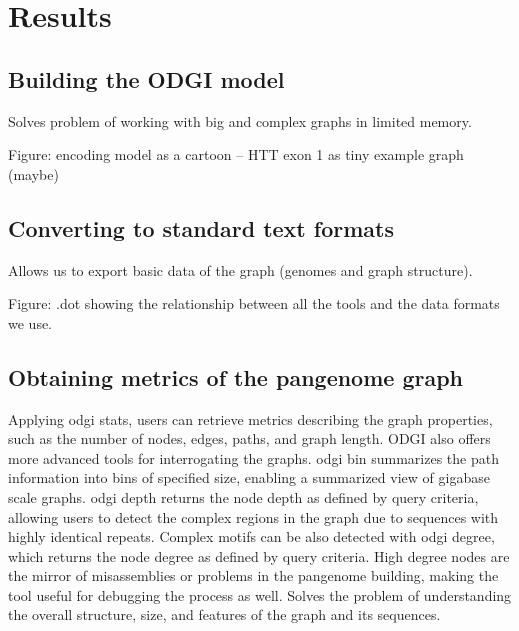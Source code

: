 \documentclass{bioinfo}
\begin{document}
\section{Results}

\subsection{Building the \textsc{ODGI} model}


Solves problem of working with big and complex graphs in limited memory.

Figure: encoding model as a cartoon --  HTT exon 1 as tiny example graph (maybe)

\subsection{Converting to standard text formats}


Allows us to export basic data of the graph (genomes and graph structure).

Figure: .dot showing the relationship between all the tools and the data formats we use.

\subsection{Obtaining metrics of the pangenome graph}



Applying odgi stats, users can retrieve metrics describing the graph properties, such as the number of nodes, edges, paths, and graph length. ODGI also offers more advanced tools for interrogating the graphs. odgi bin summarizes the path information into bins of specified size, enabling a summarized view of gigabase scale graphs. odgi depth returns the node depth as defined by query criteria, allowing users to detect the complex regions in the graph due to sequences with highly identical repeats. Complex motifs can be also detected with odgi degree, which returns the node degree as defined by query criteria. High degree nodes are the mirror of misassemblies or problems in the pangenome building, making the tool useful for debugging the process as well.
Solves the problem of understanding the overall structure, size, and features of the graph and its sequences.
\end{document}
